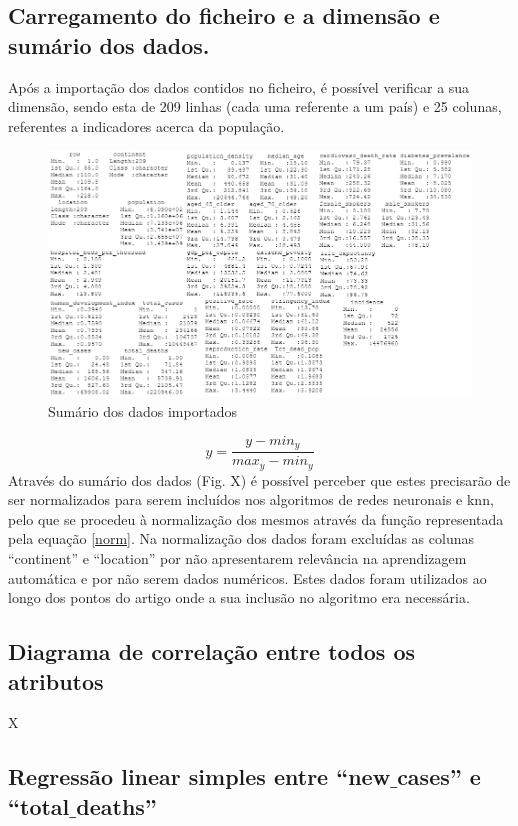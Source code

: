 \documentclass[conference]{IEEEtran}
\begin{document}
\subsection{Carregamento do ficheiro e a dimensão e sumário dos dados.} 
\label{ex01}
Após a importação dos dados contidos no ficheiro, é possível verificar a sua dimensão, sendo esta de 209 linhas (cada uma referente a um país) e 25 colunas, referentes a indicadores acerca da população.
\begin{figure}[htbp]
\centerline{\includegraphics[width=0.95\columnwidth]{images/01.png}}
\caption{Sumário dos dados importados}
\label{summary}
\end{figure}
\begin{equation}
y = \frac{y-min_{y}}{max_{y}-min_{y}} \label{norm}
\end{equation}
Através do sumário dos dados (Fig. X) é possível perceber que estes precisarão de ser normalizados para serem incluídos nos algoritmos de redes neuronais e knn, pelo que se procedeu à normalização dos mesmos através da função representada pela equação \eqref{norm}.
Na normalização dos dados foram excluídas as colunas “continent” e “location” por não apresentarem relevância na aprendizagem automática e por não serem dados numéricos. Estes dados foram utilizados ao longo dos pontos do artigo onde a sua inclusão no algoritmo era necessária.


\subsection{Diagrama de correlação entre todos os atributos}
X


\subsection{Regressão linear simples entre “new$\_$cases” e “total$\_$deaths”}
\end{document}
